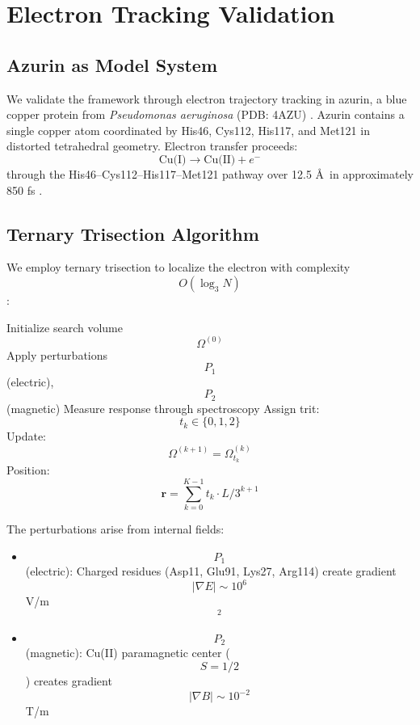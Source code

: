 \documentclass[twocolumn,10pt]{article}
\begin{document}
\section{Electron Tracking Validation}

\subsection{Azurin as Model System}

We validate the framework through electron trajectory tracking in azurin, a blue copper protein from \textit{Pseudomonas aeruginosa} (PDB: 4AZU) \cite{Nar1991}. Azurin contains a single copper atom coordinated by His46, Cys112, His117, and Met121 in distorted tetrahedral geometry. Electron transfer proceeds:
\begin{equation}
\text{Cu(I)} \to \text{Cu(II)} + e^-
\end{equation}
through the His46--Cys112--His117--Met121 pathway over 12.5 \AA\ in approximately 850 fs \cite{Gray2003}.

\subsection{Ternary Trisection Algorithm}

We employ ternary trisection to localize the electron with complexity $$O(\log_3 N)$$:

\begin{algorithm}[H]
\caption{Ternary Trisection}
\begin{algorithmic}[1]
\STATE Initialize search volume $$\Omega^{(0)}$$
    \STATE Apply perturbations $$P_1$$ (electric), $$P_2$$ (magnetic)
    \STATE Measure response through spectroscopy
    \STATE Assign trit: $$t_k \in \{0, 1, 2\}$$
    \STATE Update: $$\Omega^{(k+1)} = \Omega^{(k)}_{t_k}$$
\ENDFOR
\STATE Position: $$\mathbf{r} = \sum_{k=0}^{K-1} t_k \cdot L / 3^{k+1}$$
\end{algorithmic}
\end{algorithm}

The perturbations arise from internal fields:
\begin{itemize}
\item $$P_1$$ (electric): Charged residues (Asp11, Glu91, Lys27, Arg114) create gradient $$|\nabla E| \sim 10^6$$ V/m$$^2$$
\item $$P_2$$ (magnetic): Cu(II) paramagnetic center ($$S = 1/2$$) creates gradient $$|\nabla B| \sim 10^{-2}$$ T/m
\end{itemize}
\end{document}
